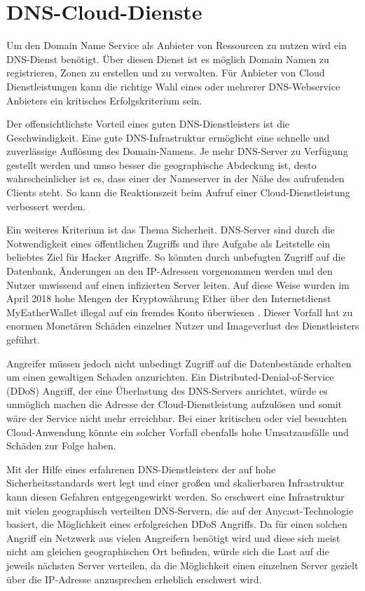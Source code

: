 \section{DNS-Cloud-Dienste}
Um den Domain Name Service als Anbieter von Ressourcen zu nutzen wird ein DNS-Dienst benötigt. Über diesen Dienst ist es möglich Domain Namen zu registrieren, Zonen zu erstellen und zu verwalten. Für Anbieter von Cloud Dienstleistungen kann die richtige Wahl eines oder mehrerer DNS-Webservice Anbieters ein kritisches Erfolgskriterium sein.

Der offensichtlichste Vorteil eines guten DNS-Dienstleisters ist die Geschwindigkeit. Eine gute DNS-Infrastruktur ermöglicht eine schnelle und zuverlässige Auflösung des Domain-Namens. Je mehr DNS-Server zu Verfügung gestellt werden und umso besser die geographische Abdeckung ist, desto wahrscheinlicher ist es, dass einer der Nameserver in der Nähe des aufrufenden Clients steht. So kann die Reaktionszeit beim Aufruf einer Cloud-Dienstleistung verbessert werden. \cite{Stratusly.2017}

Ein weiteres Kriterium ist das Thema Sicherheit. DNS-Server sind durch die Notwendigkeit eines öffentlichen Zugriffs und ihre Aufgabe als Leitstelle ein beliebtes Ziel für Hacker Angriffe. So könnten durch unbefugten Zugriff auf die Datenbank, Änderungen an den IP-Adressen vorgenommen werden und den Nutzer unwissend auf einen infizierten Server leiten. Auf diese Weise wurden im April 2018 hohe Mengen der Kryptowährung Ether über den Internetdienst MyEatherWallet illegal auf ein fremdes Konto überwiesen \cite{MEWForce.2018}. Dieser Vorfall hat zu enormen Monetären Schäden einzelner Nutzer und Imageverlust des Dienstleisters geführt. \cite{ZDNet.2018}

Angreifer müssen jedoch nicht unbedingt Zugriff auf die Datenbestände erhalten um einen gewaltigen Schaden anzurichten. Ein Distributed-Denial-of-Service (DDoS) Angriff, der eine Überlastung des DNS-Servers anrichtet, würde es unmöglich machen die Adresse der Cloud-Dienstleistung aufzulösen und somit wäre der Service nicht mehr erreichbar. Bei einer kritischen oder viel besuchten Cloud-Anwendung könnte ein solcher Vorfall ebenfalls hohe Umsatzausfälle und Schäden zur Folge haben.

Mit der Hilfe eines erfahrenen DNS-Dienstleisters der auf hohe Sicherheitsstandards wert legt und einer großen und skalierbaren Infrastruktur kann diesen Gefahren entgegengewirkt werden. So erschwert eine Infrastruktur mit vielen geographisch verteilten DNS-Servern, die auf der Anycast-Technologie basiert, die Möglichkeit eines erfolgreichen DDoS Angriffs. Da für einen solchen Angriff ein Netzwerk aus vielen Angreifern benötigt wird und diese sich meist nicht am gleichen geographischen Ort befinden, würde sich die Last auf die jeweils nächsten Server verteilen, da die Möglichkeit einen einzelnen Server gezielt über die IP-Adresse anzusprechen erheblich erschwert wird. \cite{Moura.2016}


